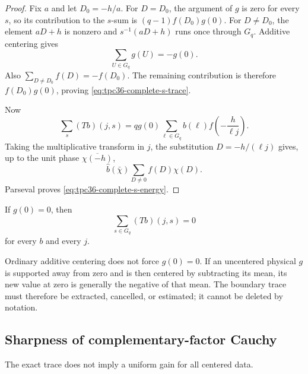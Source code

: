 \begin{proof}
Fix \(a\) and let \(D_0=-h/a\).  For \(D=D_0\), the argument of \(g\)
is zero for every \(s\), so its contribution to the \(s\)-sum is
\((q-1)f(D_0)g(0)\).  For \(D\ne D_0\), the element \(aD+h\) is nonzero
and \(s^{-1}(aD+h)\) runs once through \(G_q\).  Additive centering gives
\begin{equation}
 \sum_{U\in G_q}g(U)=-g(0).
 \label{eq:tpc36-nonzero-g-sum}
\end{equation}
Also \(\sum_{D\ne D_0}f(D)=-f(D_0)\).  The remaining contribution is
therefore \(f(D_0)g(0)\), proving
\eqref{eq:tpc36-complete-s-trace}.

Now
\begin{equation}
 \sum_s(Tb)(j,s)
 =qg(0)\sum_{\ell\in G_q}
 b(\ell)f\!\left(-\frac h{\ell j}\right).
 \label{eq:tpc36-complete-T-trace}
\end{equation}
Taking the multiplicative transform in \(j\), the substitution
\(D=-h/(\ell j)\) gives, up to the unit phase
\(\overline{\chi(-h)}\),
\begin{equation}
 \widehat b(\bar\chi)
 \sum_{D\ne0}f(D)\chi(D).
 \label{eq:tpc36-trace-transform}
\end{equation}
Parseval proves \eqref{eq:tpc36-complete-s-energy}.
\end{proof}

\begin{corollary}[Exact complete cancellation when \(g(0)=0\)]
\label{cor:tpc36-gzero-cancellation}
If \(g(0)=0\), then
\begin{equation}
 \sum_{s\in G_q}(Tb)(j,s)=0
 \label{eq:tpc36-gzero-cancellation}
\end{equation}
for every \(b\) and every \(j\).
\end{corollary}

Ordinary additive centering does not force \(g(0)=0\).  If an uncentered
physical \(g\) is supported away from zero and is then centered by
subtracting its mean, its new value at zero is generally the negative of
that mean.  The boundary trace must therefore be extracted, cancelled, or
estimated; it cannot be deleted by notation.

\subsection{Sharpness of complementary-factor Cauchy}

The exact trace does not imply a uniform gain for all centered data.

